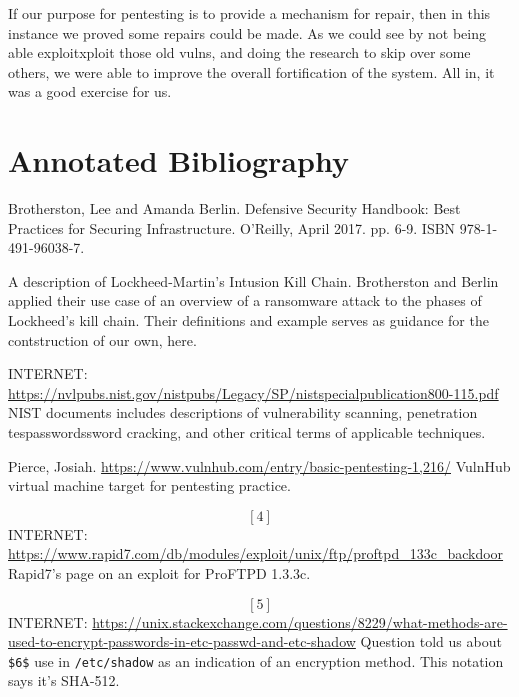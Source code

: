 If our purpose for pentesting is to provide a mechanism for repair, then in this instance we proved some repairs could be made.  As we could see by not being able \gls{exploit}xploit those old vulns, and doing the research to skip over some others, we were able to improve the overall fortification of the system.  All in, it was a good exercise for us.

\section{Annotated Bibliography}


\endnote{[1]}  Brotherston, Lee and Amanda Berlin.  Defensive Security Handbook:  Best Practices for Securing Infrastructure.  O'Reilly, April 2017. pp. 6-9. ISBN 978-1-491-96038-7. 

A description of Lockheed-Martin's Intusion Kill Chain.  Brotherston and Berlin applied their use case of an overview of a ransomware \gls{attack} to the phases of Lockheed's kill chain.  Their definitions and example serves as guidance for the contstruction of our own, here.


\endnote{[2]}  INTERNET: \url{https://nvlpubs.nist.gov/nistpubs/Legacy/SP/nistspecialpublication800-115.pdf}
NIST documents includes descriptions of vulnerability scanning, penetration tes\gls{password}ssword cracking, and other critical terms of applicable techniques.

\endnote{[3]}  Pierce, Josiah.  \url{https://www.vulnhub.com/entry/basic-pentesting-1,216/}
VulnHub virtual machine target for pentesting practice.

\[[4]\] INTERNET:  \url{https://www.rapid7.com/db/modules/exploit/unix/ftp/proftpd_133c_backdoor}
Rapid7's page on an exploit for ProFTPD 1.3.3c.

\[[5]\] INTERNET:  \url{https://unix.stackexchange.com/questions/8229/what-methods-are-used-to-encrypt-passwords-in-etc-passwd-and-etc-shadow}
Question told us about \texttt{\$6\$} use in \texttt{/etc/shadow} as an indication of an encryption method.  This notation says it's SHA-512.

